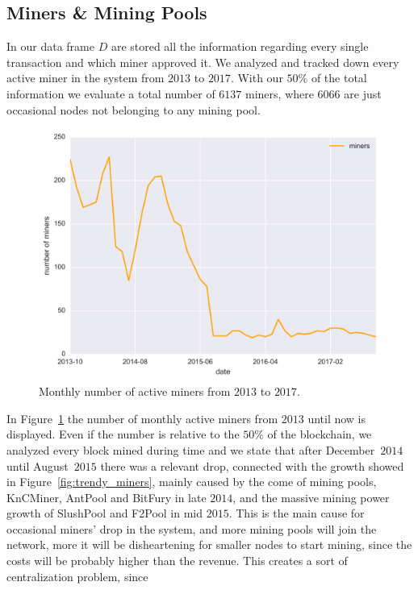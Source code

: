\documentclass[USenglish]{uit-thesis}
\begin{document}
\subsection{Miners \& Mining Pools}
\label{sec:minersminingpools}
In our data frame $D$ are stored all the information regarding
every single transaction and which miner approved it. We analyzed and
tracked down every active miner in the system from $2013$ to $2017$.
With our $50\%$ of the total information we evaluate a total number
of $6137$ miners, where $6066$ are just occasional nodes not belonging
to any mining pool.
\begin{figure}[h]
	\centering
	\includegraphics[width=1\textwidth]{img/number_of_miners}
	\caption{Monthly number of active miners from $2013$ to $2017$.}
	\label{fig:number_of_miners}
\end{figure}
In Figure~\ref{fig:number_of_miners} the number
of monthly active miners from $2013$ until now is displayed.
Even if the number is relative to the $50\%$ of the
blockchain, we analyzed every block mined during time and we state
that after December~$2014$ until August~$2015$
there was a relevant drop, connected with the growth
showed in Figure~\ref{fig:trendy_miners}, mainly caused by the come of mining
pools, KnCMiner, AntPool and BitFury in late $2014$, and the massive
mining power growth of SlushPool and F2Pool in mid $2015$.
This is the main cause for occasional miners' drop in the system,
and more mining pools will join the network, more it will be
disheartening for smaller nodes to start mining, since the costs
will be probably higher than the revenue.
This creates a sort of centralization problem, since
\end{document}
